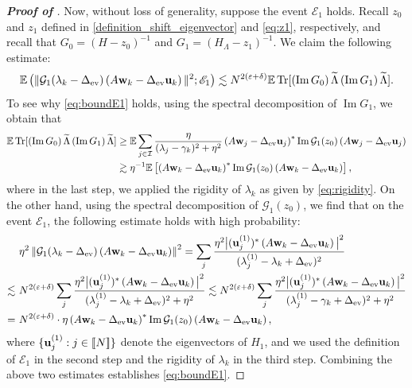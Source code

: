 \documentclass[10pt,reqno]{amsart}
\numberwithin{equation}{section}
\numberwithin{figure}{section}
\theoremstyle{plain} %
\theoremstyle{definition} %
\newcommand{\cal}{\mathcal}
\newcommand{\wt}{\widetilde}
\renewcommand{\txt}[1]{\text{\rm{#1}}}
\newcommand{\E}{\mathbb{E}}
\newcommand{\cG}{{\mathcal G}}
\newcommand{\cI}{\mathcal{I}}
\renewcommand{\geq}{\ge}
\newcommand{\qq}[1]{[\![{#1}]\!]}
\newcommand{\pa}[1]{\left({#1}\right)}
\newcommand{\qa}[1]{\left[{#1}\right]}
\DeclareMathOperator{\tr}{\mathrm{Tr}}
\DeclareMathOperator{\im}{\mathrm{Im}}
\newcommand{\bu}{{\bf{u}}}
\newcommand{\bw}{{\bf{w}}}
\newcommand{\tLambda}{{\wt{\Lambda}}}
\newcommand{\e}{{\varepsilon}}
\numberwithin{equation}{section}
\begin{document}
\begin{proof}[\bf Proof of ]
Now, without loss of generality, suppose the event $\mathscr E_1$ holds. Recall $z_0$ and $z_1$ defined in \eqref{definition_shift_eigenvector} and \eqref{eq:z1}, respectively, and recall that $G_0=\pa{H-z_0}^{-1}$ and $G_1=\pa{H_{\Lambda}-z_1}^{-1}$. We claim the following estimate: 
\begin{equation}\label{eq:boundE1}
    \E\left(\| {\cal G}_1(\lambda_k-\Delta_{\txt{ev}}) \left( A\bw_k-\Delta_{\txt{ev}} \bu_k \right)\|^2;\mathscr E_1\right)\lesssim N^{2(\e+\delta)} \E \tr[\pa{\im G_0}\tLambda \pa{\im G_1} \tLambda] .
\end{equation}
To see why \eqref{eq:boundE1} holds, using the spectral decomposition of $\im G_1$, we obtain that  
\begin{align*}
    \E \tr[\pa{\im G_0} \tLambda \pa{\im G_1} \tLambda]&\geq\E \sum_{j\in \cI} \frac{\eta}{(\lambda_j-\gamma_k)^2+\eta^2}   \left( A\bw_j-\Delta_{\txt{ev}} \bu_j \right)^*  \im \cG_1(z_0) \left( A\bw_j-\Delta_{\txt{ev}} \bu_j \right)\\
&\gtrsim \eta^{-1} \E\qa{ \left( A\bw_k-\Delta_{\txt{ev}} \bu_k \right)^*  \im \cG_1(z_0) \left( A\bw_k-\Delta_{\txt{ev}} \bu_k \right)} ,
\end{align*}
where in the last step, we applied the rigidity of $\lambda_k$ as given by \eqref{eq:rigidity}. On the other hand, using the spectral decomposition of $\cG_1\pa{z_0}$, we find that on the event $\mathscr E_1$, the following estimate holds with high probability:
\begin{align*}
&~\eta^2\left\| {\cal G}_1(\lambda_k-\Delta_{\txt{ev}}) \left( A\bw_k-\Delta_{\txt{ev}} \bu_k \right)\right\|^2 = \sum_{j} \frac{\eta^2\big|(\bu_j^{(1)})^* \left( A\bw_k-\Delta_{\txt{ev}} \bu_k \right)\big|^2}{(\lambda_j^{(1)}-\lambda_k+\Delta_{\txt{ev}})^2}\\
\lesssim&~ N^{2(\e+\delta)}\sum_{j} \frac{\eta^2\big|(\bu_j^{(1)})^* \left( A\bw_k-\Delta_{\txt{ev}} \bu_k \right)\big|^2}{(\lambda_j^{(1)}-\lambda_k+\Delta_{\txt{ev}})^2+\eta^2}
\lesssim N^{2(\e+\delta)}\sum_{j} \frac{\eta^2\big|(\bu_j^{(1)})^* \left( A\bw_k-\Delta_{\txt{ev}} \bu_k \right)\big|^2}{(\lambda_j^{(1)}-\gamma_k+\Delta_{\txt{ev}})^2+\eta^2}\\
=&~ N^{2(\e+\delta)} \cdot \eta \left( A\bw_k-\Delta_{\txt{ev}} \bu_k \right)^*  \im \cG_1(z_0) \left( A\bw_k-\Delta_{\txt{ev}} \bu_k \right) ,
\end{align*}
where $\{\bu_j^{(1)}:j\in \qq{N}\}$ denote the eigenvectors of $H_1$, and we used the definition of $\mathscr E_1$ in the second step and the rigidity of $\lambda_k$ in the third step. Combining the above two estimates establishes \eqref{eq:boundE1}. 


\end{proof}
\end{document}
